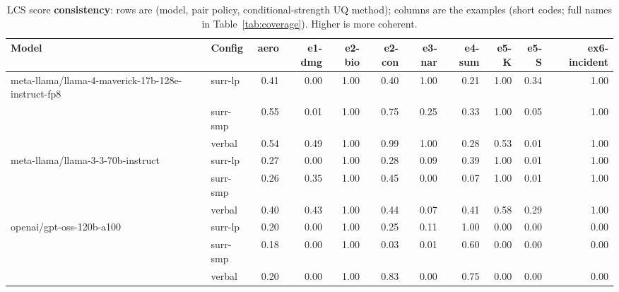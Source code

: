\documentclass[11pt]{article}
\begin{document}
\begin{table}[htbp]
\centering
\footnotesize
\setlength{\tabcolsep}{3.5pt}
\caption{LCS score \textbf{consistency}: rows are (model, pair policy, conditional-strength UQ method); columns are the examples (short codes; full names in Table~\ref{tab:coverage}). Higher is more coherent.}
\label{tab:consistency}
\begin{tabular}{llrrrrrrrrr}
\toprule
\textbf{Model} & \textbf{Config} & \textbf{aero} & \textbf{e1-dmg} & \textbf{e2-bio} & \textbf{e2-con} & \textbf{e3-nar} & \textbf{e4-sum} & \textbf{e5-K} & \textbf{e5-S} & \textbf{ex6-incident} \\
\midrule
meta-llama/llama-4-maverick-17b-128e-instruct-fp8 & surr-lp & 0.41 & 0.00 & 1.00 & 0.40 & 1.00 & 0.21 & 1.00 & 0.34 & 1.00 \\
 & surr-smp & 0.55 & 0.01 & 1.00 & 0.75 & 0.25 & 0.33 & 1.00 & 0.05 & 1.00 \\
 & verbal & 0.54 & 0.49 & 1.00 & 0.99 & 1.00 & 0.28 & 0.53 & 0.01 & 1.00 \\
\midrule
meta-llama/llama-3-3-70b-instruct & surr-lp & 0.27 & 0.00 & 1.00 & 0.28 & 0.09 & 0.39 & 1.00 & 0.01 & 1.00 \\
 & surr-smp & 0.26 & 0.35 & 1.00 & 0.45 & 0.00 & 0.07 & 1.00 & 0.01 & 1.00 \\
 & verbal & 0.40 & 0.43 & 1.00 & 0.44 & 0.07 & 0.41 & 0.58 & 0.29 & 1.00 \\
\midrule
openai/gpt-oss-120b-a100 & surr-lp & 0.20 & 0.00 & 1.00 & 0.25 & 0.11 & 1.00 & 0.00 & 0.00 & 0.00 \\
 & surr-smp & 0.18 & 0.00 & 1.00 & 0.03 & 0.01 & 0.60 & 0.00 & 0.00 & 0.00 \\
 & verbal & 0.20 & 0.00 & 1.00 & 0.83 & 0.00 & 0.75 & 0.00 & 0.00 & 0.00 \\
\bottomrule
\end{tabular}
\end{table}
\end{document}
